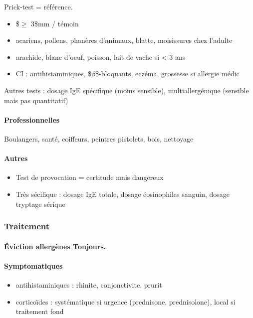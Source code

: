 \documentclass[11pt]{article}
\begin{document}
Prick-test = référence.

\begin{itemize}
\item \$\diameter \(\ge\) 3\$mm / témoin
\item acariens, pollens, phanères d'animaux, blatte, moisissures chez l'adulte
\item arachide, blanc d'oeuf, poisson, lait de vache si < 3 ans
\item CI : antihistaminiques, \$\(\beta\)\$-bloquants, eczéma, grossesse si
allergie médic
\end{itemize}


Autres tests : dosage IgE spécifique (moins sensible), multiallergénique (sensible mais
pas quantitatif)

\paragraph{Professionnelles}
\label{sec:orgfaa267a}
Boulangers, santé, coiffeurs, peintres pistolets, bois, nettoyage

\paragraph{Autres}
\label{sec:org2bf65d7}
\begin{itemize}
\item Test de provocation = certitude mais dangereux
\item Très sécifique : dosage IgE totale, dosage éosinophiles sanguin, dosage tryptage sérique
\end{itemize}

\subsubsection{Traitement}
\label{sec:org68384d7}
\paragraph{Éviction allergènes Toujours.}
\label{sec:org52526d5}

\paragraph{Symptomatiques}
\label{sec:org0393d80}

\begin{itemize}
\item antihistaminiques : rhinite, conjonctivite, prurit
\item corticoïdes : systématique si urgence (prednisone, prednisolone), local
si traitement fond
\end{itemize}
\end{document}
